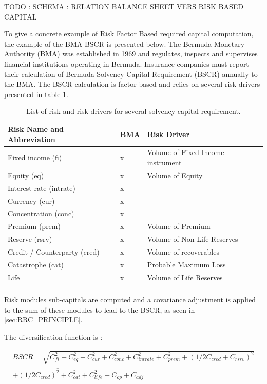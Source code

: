 TODO : SCHEMA : RELATION BALANCE SHEET VERS RISK BASED CAPITAL


To give a concrete example of Risk Factor Based required capital computation, the example of the BMA BSCR is presented below.
The Bermuda Monetary Authority (BMA) was established in 1969 and regulates, inspects and supervises financial institutions operating in Bermuda. Insurance companies must report their calculation of Bermuda Solvency Capital Requirement (BSCR) annually to the BMA.
The BSCR calculation is factor-based and relies on several risk drivers presented in table \ref{tab:RISK_LIST}.

\begin{table}[h!]
\centering
\begin{tabular}{|l|l|l|}
\hline
   \textbf{Risk Name and Abbreviation} & \textbf{BMA} & \textbf{Risk Driver} \\ \hline
   Fixed income (fi) & x  & Volume of Fixed Income instrument\\ \hline
   Equity (eq) & x  & Volume of Equity \\ \hline
   Interest rate (intrate) & x & \\ \hline
   Currency (cur) & x & \\ \hline
   Concentration (conc) & x & \\ \hline
   Premium (prem) & x & Volume of Premium \\ \hline
   Reserve (rsrv) & x &  Volume of Non-Life Reserves \\ \hline
   Credit / Counterparty (cred) & x & Volume of recoverables\\ \hline
   Catastrophe (cat) & x & Probable Maximum Loss\\ \hline
   Life & x & Volume of Life Reserves \\
   \hline
   \label{tab:RISK_LIST}
\end{tabular}
   \caption{List of risk and risk drivers for several solvency capital requirement.}
\end{table}

Risk modules sub-capitals are computed and a covariance adjustment is applied to the sum of these modules to lead to the BSCR, as seen in \ref{sec:RRC_PRINCIPLE}.

The diversification function is :

\begin{multline}
	BSCR = \sqrt{C_{fi}^2 + C_{eq}^2 + C_{cur}^2 + C_{conc}^2 + C_{intrate}^2 + C_{prem}^2 + (1/2 C_{cred} + C_{rsrv} )^2 } \\ \overline{  + (1/2 C_{cred})^2 + C_{cat}^2 + C_{life}^2 } + C_{op} + C_{adj}
\end{multline}

